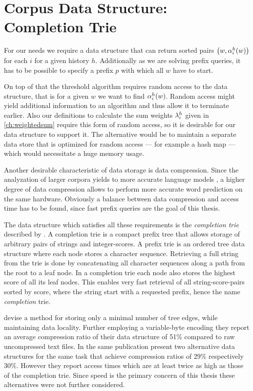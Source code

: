 \section{Corpus Data Structure: Completion Trie}
\label{sec:completiontrie}

For our needs we require a data structure that can return sorted pairs
$\left(w, \alpha^h_i(w)\right)$ for each $i$ for a given history $h$.
Additionally as we are solving prefix queries, it has to be possible to specify
a prefix $p$ with which all $w$ have to start.

On top of that the threshold algorithm requires random access to the data
structure, that is for a given $w$ we want to find $\alpha^h_i(w)$.
Random access might yield additional information to an algorithm and thus allow
it to terminate earlier.
Also our definitions to calculate the sum weights $\lambda^h_i$ given in
\cref{ch:weightedsum} require this form of random access, so it is desirable for
our data structure to support it.
The alternative would be to maintain a separate data store that is optimized for
random access --- for example a hash map --- which would necessitate a huge
memory usage.

Another desirable characteristic of data storage is data compression.
Since the analyzation of larger corpora yields to more accurate language models
\noref, a higher degree of data compression allows to perform more accurate
word prediction on the same hardware.
Obviously a balance between data compression and access time has to be found,
since fast prefix queries are the goal of this thesis.

The data structure which satisfies all these requirements is the
\emph{completion trie} described by \textcite{HsuOttaviano2013}.
A completion trie is a compact prefix tree that allows storage of arbitrary
pairs of strings and integer-scores.
A prefix trie is an ordered tree data structure where each node stores a
character sequence.
Retrieving a full string from the trie is done by concatenating all character
sequences along a path from the root to a leaf node.
In a completion trie each node also stores the highest score of all its leaf
nodes.
This enables very fast retrieval of all string-score-pairs sorted by score,
where the string start with a requested prefix, hence the name
\emph{completion} trie.

\textcite{HsuOttaviano2013} devise a method for storing only a minimal number of
tree edges, while maintaining data locality.
Further employing a variable-byte encoding they report an average compression
ratio of their data structure of 51\% compared to raw uncompressed text files.
In the same publication \textcite{HsuOttaviano2013} present two alternative
data structures for the same task that achieve compression ratios of 29\%
respectively 30\%.
However they report access times which are at least twice as high as those
of the completion trie.
Since speed is the primary concern of this thesis these alternatives
were not further considered.

